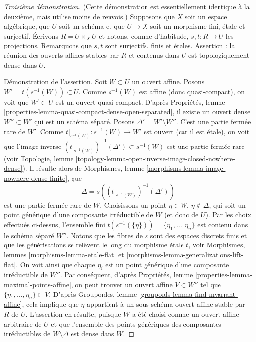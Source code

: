 \begin{proof}[Troisième démonstration]
(Cette démonstration est essentiellement identique à la deuxième, mais
utilise moins de renvois.)
Supposons que $X$ soit un espace algébrique, que $U$ soit un schéma et que
$U \to X$ soit un morphisme fini, étale et surjectif. Écrivons
$R = U \times_X U$ et notons, comme d'habitude,
$s, t : R \to U$ les projections. Remarquons que $s, t$ sont surjectifs,
finis et étales. Assertion : la réunion des ouverts affines stables par $R$
et contenus dans $U$ est topologiquement dense dans $U$.

\medskip\noindent
Démonstration de l'assertion. Soit $W \subset U$ un ouvert affine.
Posons $W' = t(s^{-1}(W)) \subset U$. Comme $s^{-1}(W)$ est affine
(donc quasi-compact), on voit que $W' \subset U$ est un ouvert
quasi-compact. D'après
Propriétés, lemme \ref{properties-lemma-quasi-compact-dense-open-separated},
il existe un ouvert dense $W'' \subset W'$ qui est un schéma séparé.
Posons $\Delta' = W' \setminus W''$. C'est une partie fermée rare de $W'$.
Comme $t|_{s^{-1}(W)} : s^{-1}(W) \to W'$ est ouvert (car il est étale),
on voit que l'image inverse
$(t|_{s^{-1}(W)})^{-1}(\Delta') \subset s^{-1}(W)$
est une partie fermée rare (voir
Topologie, lemme \ref{topology-lemma-open-inverse-image-closed-nowhere-dense}).
Il résulte alors de
Morphismes, lemme \ref{morphisms-lemma-image-nowhere-dense-finite}, que
$$
\Delta = s\left((t|_{s^{-1}(W)})^{-1}(\Delta')\right)
$$
est une partie fermée rare de $W$. Choisissons un point $\eta \in W$,
$\eta \not \in \Delta$, qui soit un point générique d'une composante
irréductible de $W$ (et donc de $U$). Par les choix effectués ci-dessus,
l'ensemble fini
$t(s^{-1}(\{\eta\})) = \{\eta_1, \ldots, \eta_n\}$
est contenu dans le schéma séparé $W''$.
Notons que les fibres de $s$ sont des espaces discrets finis et que les
générisations se relèvent le long du morphisme étale $t$, voir
Morphismes, lemmes \ref{morphisms-lemma-etale-flat}
et \ref{morphisms-lemma-generalizations-lift-flat}.
On voit ainsi que chaque $\eta_i$ est un point générique d'une composante
irréductible de $W''$. Par conséquent, d'après
Propriétés, lemme \ref{properties-lemma-maximal-points-affine},
on peut trouver un ouvert affine $V \subset W''$ tel que
$\{\eta_1, \ldots, \eta_n\} \subset V$.
D'après
Groupoïdes, lemme \ref{groupoids-lemma-find-invariant-affine},
cela implique que $\eta$ appartient à un sous-schéma ouvert affine stable
par $R$ de $U$. L'assertion en résulte, puisque $W$ a été choisi comme un
ouvert affine arbitraire de $U$ et que l'ensemble des points génériques
des composantes irréductibles de $W \setminus \Delta$ est dense dans $W$.


\end{proof}
